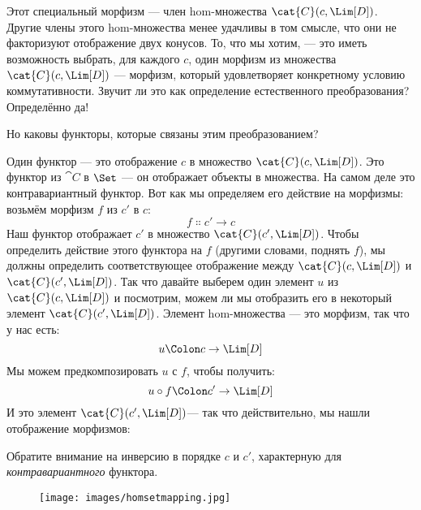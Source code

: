 Этот специальный морфизм --- член hom-множества $\cat{C}(c, \Lim[D])$.
Другие члены этого hom-множества менее удачливы в том смысле, что
они не факторизуют отображение двух конусов. То, что мы хотим, --- это иметь возможность
выбрать, для каждого $c$, один морфизм из множества
$\cat{C}(c, \Lim[D])$ --- морфизм, который удовлетворяет конкретному
условию коммутативности. Звучит ли это как определение естественного
преобразования? Определённо да!

Но каковы функторы, которые связаны этим преобразованием?

Один функтор --- это отображение $c$ в множество
$\cat{C}(c, \Lim[D])$. Это функтор из $\cat{C}$ в $\Set$ ---
он отображает объекты в множества. На самом деле это контравариантный функтор. Вот
как мы определяем его действие на морфизмы: возьмём морфизм $f$
из $c'$ в $c$:
\[f \Colon c' \to c\]
Наш функтор отображает $c'$ в множество
$\cat{C}(c', \Lim[D])$. Чтобы определить действие этого функтора на
$f$ (другими словами, поднять $f$), мы должны определить
соответствующее отображение между $\cat{C}(c, \Lim[D])$ и
$\cat{C}(c', \Lim[D])$. Так что давайте выберем один элемент $u$ из
$\cat{C}(c, \Lim[D])$ и посмотрим, можем ли мы отобразить его в некоторый элемент
$\cat{C}(c', \Lim[D])$. Элемент hom-множества --- это морфизм, так что
у нас есть:
\[u \Colon c \to \Lim[D]\]
Мы можем предкомпозировать $u$ с $f$, чтобы получить:
\[u \circ f \Colon c' \to \Lim[D]\]
И это элемент $\cat{C}(c', \Lim[D])$--- так что действительно, мы
нашли отображение морфизмов:

Обратите внимание на инверсию в порядке $c$ и $c'$,
характерную для \emph{контравариантного} функтора.

\begin{figure}[H]
  \centering
  \texttt{[image: images/homsetmapping.jpg]}
\end{figure}


